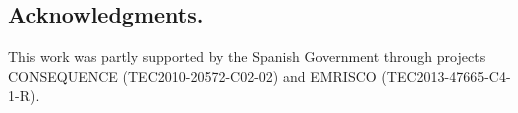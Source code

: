 \documentclass[runningheads,a4paper]{llncs}
\begin{document}
\subsection*{Acknowledgments.} This work was partly supported by the Spanish Government through projects CONSEQUENCE (TEC2010-20572-C02-02) and EMRISCO (TEC2013-47665-C4-1-R).




\end{document}

